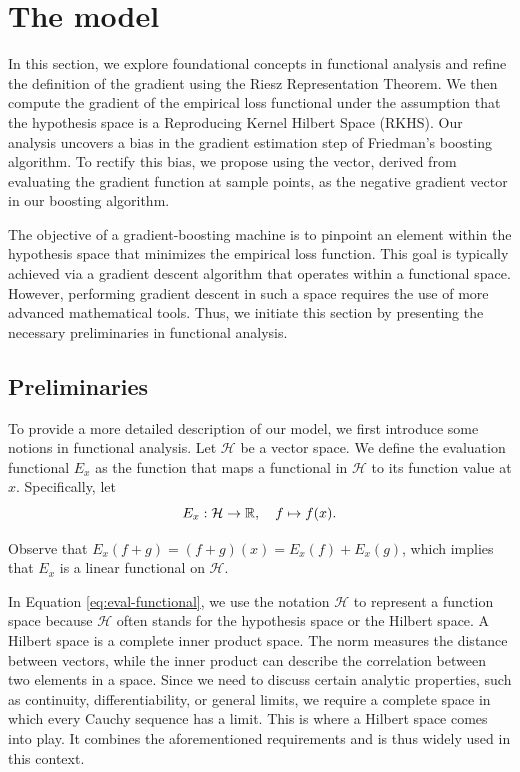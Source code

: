 \section{The model}
In this section, we explore foundational concepts in functional analysis and refine the definition of the gradient using the Riesz Representation Theorem. We then compute the gradient of the empirical loss functional under the assumption that the hypothesis space is a Reproducing Kernel Hilbert Space (RKHS). Our analysis uncovers a bias in the gradient estimation step of Friedman's boosting algorithm. To rectify this bias, we propose using the vector, derived from evaluating the gradient function at sample points, as the negative gradient vector in our boosting algorithm.

The objective of a gradient-boosting machine is to pinpoint an element within the hypothesis space that minimizes the empirical loss function. This goal is typically achieved via a gradient descent algorithm that operates within a functional space. However, performing gradient descent in such a space requires the use of more advanced mathematical tools. Thus, we initiate this section by presenting the necessary preliminaries in functional analysis.



\subsection{Preliminaries}

To provide a more detailed description of our model, we first introduce some notions in functional analysis.
Let $\mathcal{H}$ be a vector space. We define the evaluation functional $E_x$ as the function that maps a functional in $\mathcal{H}$ to its function value at $x$. Specifically, let
\begin{equation}\label{eq:eval-functional}
E_x: \mathcal{H} \to \mathbb{R}, \quad f \mapsto f(x).
\end{equation}

Observe that $E_x(f+g) = (f+g)(x) = E_x(f) + E_x(g)$, which implies that $E_x$ is a linear functional on $\mathcal{H}$.

In Equation \ref{eq:eval-functional}, we use the notation $\mathcal{H}$ to represent a function space because $\mathcal{H}$ often stands for the hypothesis space or the Hilbert space. A Hilbert space is a complete inner product space. The norm measures the distance between vectors, while the inner product can describe the correlation between two elements in a space. Since we need to discuss certain analytic properties, such as continuity, differentiability, or general limits, we require a complete space in which every Cauchy sequence has a limit. This is where a Hilbert space comes into play. It combines the aforementioned requirements and is thus widely used in this context.


